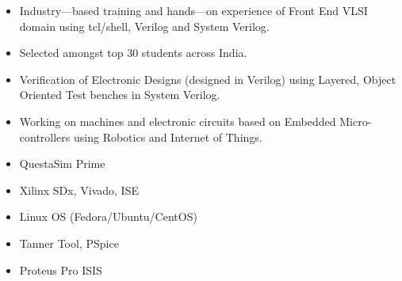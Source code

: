 \documentclass[10pt,a4paper,ragged2e]{altacv}
\begin{document}
\divider

\begin{itemize}
\item Industry—based training and hands—on experience of Front End VLSI domain using tcl/shell, Verilog and System Verilog.
\end{itemize}

\divider

\begin{itemize}
\item Selected amongst top 30 students across India.
\item Verification of Electronic Designs (designed in Verilog) using Layered, Object Oriented Test benches in System Verilog.
\end{itemize}

\divider

\begin{itemize}
\item Working on machines and electronic circuits based on Embedded Micro-controllers using Robotics and Internet of Things.
\end{itemize}





\begin{itemize}
\item QuestaSim Prime
\item Xilinx SDx, Vivado, ISE
\item Linux OS (Fedora/Ubuntu/CentOS)
\item Tanner Tool, PSpice
\item Proteus Pro ISIS
\end{itemize}


\end{document}
